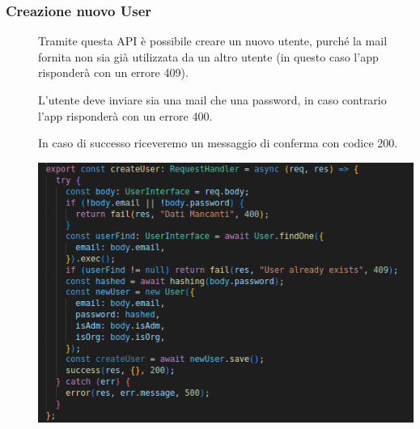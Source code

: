 \documentclass{article}
\begin{document}
\subsubsection{Creazione nuovo User}
\begin{description}
    \item[] Tramite questa API è possibile creare un nuovo utente, purché la mail fornita non sia già utilizzata da un altro utente (in questo caso l'app risponderà con un errore 409).
    \item[] L'utente deve inviare sia una mail che una password, in caso contrario l'app risponderà con un errore 400.
    \item[] In caso di successo riceveremo un messaggio di conferma con codice 200.
    \item[] \begin{center}
            \includegraphics[scale=0.5]{newUser.png}
        \end{center}
\end{description}
\clearpage
\end{document}
